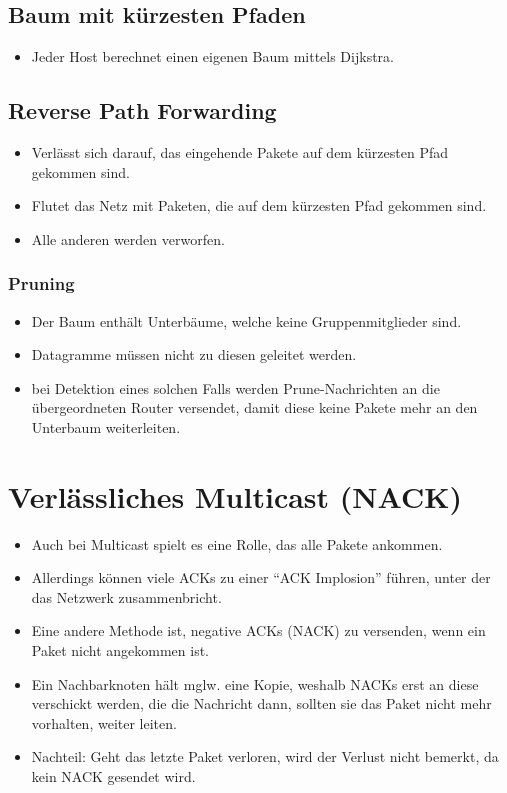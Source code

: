 		\subsection{Baum mit kürzesten Pfaden}
			\begin{itemize}
				\item Jeder Host berechnet einen eigenen Baum mittels Dijkstra.
			\end{itemize}

		\subsection{Reverse Path Forwarding}
			\begin{itemize}
				\item Verlässt sich darauf, das eingehende Pakete auf dem kürzesten Pfad gekommen sind.
				\item Flutet das Netz mit Paketen, die auf dem kürzesten Pfad gekommen sind.
				\item Alle anderen werden verworfen.
			\end{itemize}

			\subsubsection{Pruning}
				\begin{itemize}
					\item Der Baum enthält Unterbäume, welche keine Gruppenmitglieder sind.
					\item Datagramme müssen nicht zu diesen geleitet werden.
					\item bei Detektion eines solchen Falls werden Prune-Nachrichten an die übergeordneten Router versendet, damit diese keine Pakete mehr an den Unterbaum weiterleiten.
				\end{itemize}

	\section{Verlässliches Multicast (NACK)}
		\begin{itemize}
			\item Auch bei Multicast spielt es eine Rolle, das alle Pakete ankommen.
			\item Allerdings können viele ACKs zu einer \enquote{ACK Implosion} führen, unter der das Netzwerk zusammenbricht.
			\item Eine andere Methode ist, negative ACKs (NACK) zu versenden, wenn ein Paket nicht angekommen ist.
			\item Ein Nachbarknoten hält mglw. eine Kopie, weshalb NACKs erst an diese verschickt werden, die die Nachricht dann, sollten sie das Paket nicht mehr vorhalten, weiter leiten.
			\item Nachteil: Geht das letzte Paket verloren, wird der Verlust nicht bemerkt, da kein NACK gesendet wird.
		\end{itemize}


